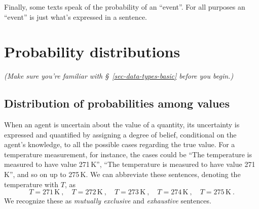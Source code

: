 \documentclass[
  a4paper,
  DIV=11,
  numbers=noendperiod,
  oneside]{scrreprt}
\begin{document}
Finally, some texts speak of the probability of an ``event''. For all
purposes an ``event'' is just what's expressed in a sentence.

\hypertarget{probability-distributions}{%
\chapter{Probability distributions}\label{probability-distributions}}

\providecommand{\ul}{\uline}
\renewcommand*{\|}[1][]{\nonscript\:#1\vert\nonscript\:\mathopen{}}
\providecommand*{\pr}[1]{\textsf{\small`#1'}}
\renewcommand*{\pr}[1]{\textsf{\small`#1'}}
\providecommand*{\prq}[1]{\textsf{\small #1}}

\providecommand{\se}[1]{\mathsfit{#1}}
\renewcommand{\se}[1]{\mathsfit{#1}}
\providecommand{\p}{\mathrm{p}}
\renewcommand{\p}{\mathrm{p}}
\renewcommand{\P}{\mathrm{P}}

\providecommand*{\mo}[1][=]{\mathord{\,#1\,}}
\providecommand*{\yX}{\se{X}}
\providecommand*{\yY}{\se{Y}}
\providecommand*{\yI}{\se{I}}
\providecommand{\di}{\mathrm{d}}

{\emph{(Make sure you're familiar with §~\ref{sec-data-types-basic}
before you begin.)}}

\hypertarget{distribution-of-probabilities-among-values}{%
\section{Distribution of probabilities among
values}\label{distribution-of-probabilities-among-values}}

When an agent is uncertain about the value of a quantity, its
uncertainty is expressed and quantified by assigning a degree of belief,
conditional on the agent's knowledge, to all the possible cases
regarding the true value. For a temperature measurement, for instance,
the cases could be ``{The temperature is measured to have value
271\,K}'', ``{The temperature is measured to have value 271\,K}'', and
so on up to 275\,K. We can abbreviate these sentences, denoting the
temperature with \(T\), as \[
T = 271\,\mathrm{K} \ , \quad
T = 272\,\mathrm{K} \ , \quad
T = 273\,\mathrm{K} \ , \quad
T = 274\,\mathrm{K} \ , \quad
T = 275\,\mathrm{K} \ .
\] We recognize these as \emph{mutually exclusive} and \emph{exhaustive}
sentences.
\end{document}
